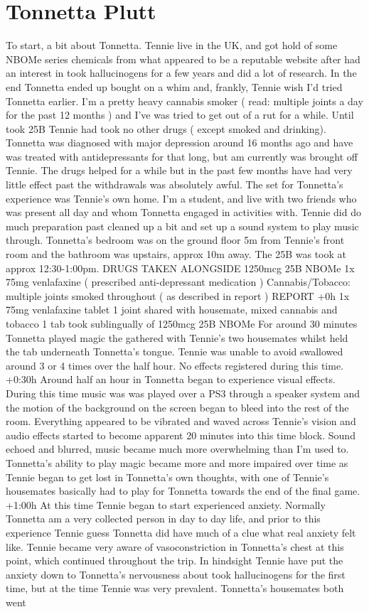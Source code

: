 \documentclass[12pt]{book}
\begin{document}
\chapter{Tonnetta Plutt}

To start, a bit about Tonnetta. Tennie live in the UK, and got hold of some NBOMe series chemicals from what appeared to be a reputable website after had an interest in took hallucinogens for a few years and did a lot of research. In the end Tonnetta ended up bought on a whim and, frankly, Tennie wish I'd tried Tonnetta earlier. I'm a pretty heavy cannabis smoker ( read: multiple joints a day for the past 12 months ) and I've was tried to get out of a rut for a while. Until took 25B Tennie had took no other drugs ( except smoked and drinking). Tonnetta was diagnosed with major depression around 16 months ago and have was treated with antidepressants for that long, but am currently was brought off Tennie. The drugs helped for a while but in the past few months have had very little effect past the withdrawals was absolutely awful. The set for Tonnetta's experience was Tennie's own home. I'm a student, and live with two friends who was present all day and whom Tonnetta engaged in activities with. Tennie did do much preparation past cleaned up a bit and set up a sound system to play music through. Tonnetta's bedroom was on the ground floor 5m from Tennie's front room and the bathroom was upstairs, approx 10m away. The 25B was took at approx 12:30-1:00pm. DRUGS TAKEN ALONGSIDE 1250mcg 25B NBOMe 1x 75mg venlafaxine ( prescribed anti-depressant medication ) Cannabis/Tobacco: multiple joints smoked throughout ( as described in report ) REPORT +0h 1x 75mg venlafaxine tablet 1 joint shared with housemate, mixed cannabis and tobacco 1 tab took sublingually of 1250mcg 25B NBOMe For around 30 minutes Tonnetta played magic the gathered with Tennie's two housemates whilst held the tab underneath Tonnetta's tongue. Tennie was unable to avoid swallowed around 3 or 4 times over the half hour. No effects registered during this time. +0:30h Around half an hour in Tonnetta began to experience visual effects. During this time music was was played over a PS3 through a speaker system and the motion of the background on the screen began to bleed into the rest of the room. Everything appeared to be vibrated and waved across Tennie's vision and audio effects started to become apparent 20 minutes into this time block. Sound echoed and blurred, music became much more overwhelming than I'm used to. Tonnetta's ability to play magic became more and more impaired over time as Tennie began to get lost in Tonnetta's own thoughts, with one of Tennie's housemates basically had to play for Tonnetta towards the end of the final game. +1:00h At this time Tennie began to start experienced anxiety. Normally Tonnetta am a very collected person in day to day life, and prior to this experience Tennie guess Tonnetta did have much of a clue what real anxiety felt like. Tennie became very aware of vasoconstriction in Tonnetta's chest at this point, which continued throughout the trip. In hindsight Tennie have put the anxiety down to Tonnetta's nervousness about took hallucinogens for the first time, but at the time Tennie was very prevalent. Tonnetta's housemates both went 
\end{document}
